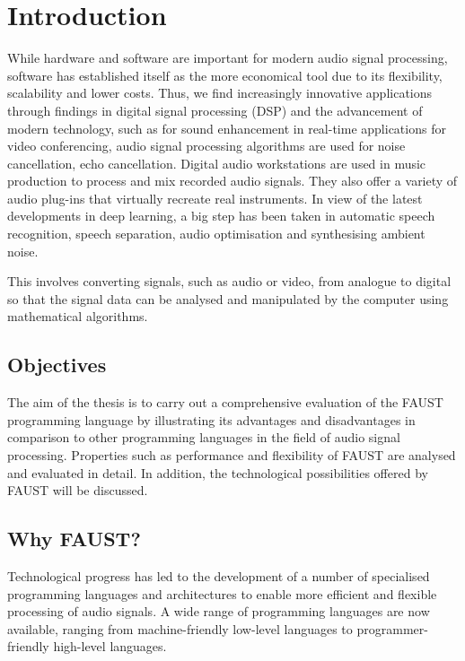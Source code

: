 \chapter{Introduction}
\label{cha:Introduction}

While hardware and software are important for modern audio signal processing, software has established itself as the more economical tool due to its flexibility, scalability and lower costs. Thus, we find increasingly innovative applications through findings in digital signal processing (DSP) and the advancement of modern technology, such as for sound enhancement in real-time applications for video conferencing, audio signal processing algorithms are used for noise cancellation, echo cancellation. Digital audio workstations are used in music production to process and mix recorded audio signals. They also offer a variety of audio plug-ins that virtually recreate real instruments. In view of the latest developments in deep learning, a big step has been taken in automatic speech recognition, speech separation, audio optimisation and synthesising ambient noise.  

This involves converting signals, such as audio or video, from analogue to digital so that the signal data can be analysed and manipulated by the computer using mathematical algorithms.  

\section{Objectives}

The aim of the thesis is to carry out a comprehensive evaluation of the FAUST programming language by illustrating its advantages and disadvantages in comparison to other programming languages in the field of audio signal processing. Properties such as performance and flexibility of FAUST are analysed and evaluated in detail. In addition, the technological possibilities offered by FAUST will be discussed.  


\section{Why FAUST?}

Technological progress has led to the development of a number of specialised programming languages and architectures to enable more efficient and flexible processing of audio signals. A wide range of programming languages are now available, ranging from machine-friendly low-level languages to programmer-friendly high-level languages.  

